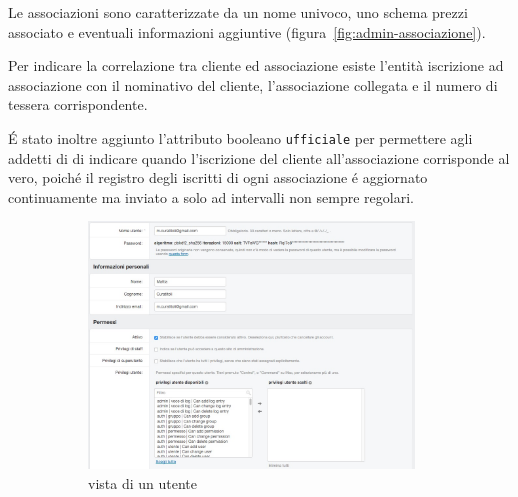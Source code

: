 Le \textsf{associazioni} sono caratterizzate da un nome univoco, uno schema prezzi associato e eventuali informazioni aggiuntive (figura~\ref{fig:admin-associazione}).

Per indicare la correlazione tra cliente ed associazione esiste l'entità \textsf{iscrizione ad associazione} con il nominativo del cliente, l'associazione collegata e il numero di tessera corrispondente.

É stato inoltre aggiunto l'attributo booleano \texttt{ufficiale} per permettere agli addetti di {\fem} di indicare quando l'iscrizione del cliente all'associazione corrisponde al vero, poiché il registro degli iscritti di ogni associazione é aggiornato continuamente ma inviato a {\fem} solo ad intervalli non sempre regolari.

\begin{figure}
 \centering
 \begin{subfigure}[b]{0.69\textwidth}
   \includegraphics[width=0.95\textwidth]{images/admin-utente} \quad
   \caption{vista di un utente}
   \label{fig:admin-utente}
 \end{subfigure}
 \begin{subfigure}[b]{0.29\textwidth}

\end{subfigure}
\end{figure}
